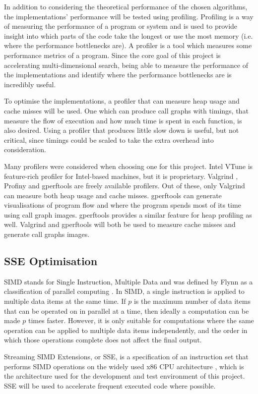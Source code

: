 In addition to considering the theoretical performance of the chosen algorithms, the implementations' performance will be tested using profiling. Profiling is a way of measuring the performance of a program or system \cite{efficient-cpp} and is used to provide insight into which parts of the code take the longest or use the most memory (i.e. where the performance bottlenecks are). A profiler is a tool which measures some performance metrics of a program. Since the core goal of this project is accelerating multi-dimensional search, being able to measure the performance of the implementations and identify where the performance bottlenecks are is incredibly useful.

To optimise the implementations, a profiler that can measure heap usage and cache misses will be used. One which can produce call graphs with timings, that measure the flow of execution and how much time is spent in each function, is also desired. Using a profiler that produces little slow down is useful, but not critical, since timings could be scaled to take the extra overhead into consideration. 

Many profilers were considered when choosing one for this project. Intel VTune \cite{intel-vtune} is feature-rich profiler for Intel-based machines, but it is proprietary. Valgrind \cite{valgrind}, Profiny \cite{profiny} and gperftools \cite{gperftools} are freely available profilers. Out of these, only Valgrind can measure both heap usage and cache misses. gperftools can generate visualisations of program flow and where the program spends most of its time using call graph images. gperftools provides a similar feature for heap profiling as well. Valgrind and gperftools will both be used to measure cache misses and generate call graphs images.

\subsection{SSE Optimisation}
\label{sec:sse}

SIMD stands for Single Instruction, Multiple Data and was defined by Flynn as a classification of parallel computing \cite{flynns-taxonomy}. In SIMD, a single instruction is applied to multiple data items at the same time. If $p$ is the maximum number of data items that can be operated on in parallel at a time, then ideally a computation can be made $p$ times faster. However, it is only suitable for computations where the same operation can be applied to multiple data items independently, and the order in which those operations complete does not affect the final output.

Streaming SIMD Extensions, or SSE, is a specification of an instruction set that performs SIMD operations on the widely used x86 CPU architecture \cite{sse}, which is the architecture used for the development and test environment of this project. SSE will be used to accelerate frequent executed code where possible.